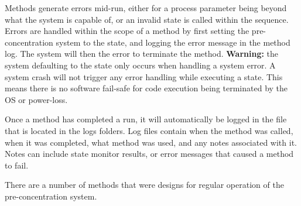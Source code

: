 Methods generate errors mid-run, either for a process parameter being beyond what the system is capable of, or an invalid state is called within the sequence. Errors are handled within the scope of a method by first setting the pre-concentration system to the  state, and logging the error message in the method log. The system will then  the error to terminate the method. \textbf{Warning:} the system defaulting to the  state only occurs when handling a system error. A system crash will not trigger any error handling while executing a state. This means there is no software fail-safe for code execution being terminated by the OS or power-loss.

Once a method has completed a run, it will automatically be logged in the  file that is located in the logs folders. Log files contain when the method was called, when it was completed, what method was used, and any notes associated with it. Notes can include state monitor results, or error messages that caused a method to fail.


There are a number of methods that were designs for regular operation of the pre-concentration system.

